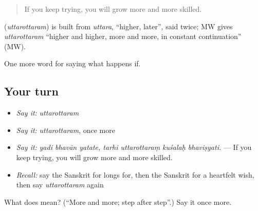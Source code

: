 \begin{quote}
If you keep trying, you will grow more and more skilled.
\end{quote}

\begin{cousinweb}
\textbf{} (\emph{uttarottaram}) is built from \emph{uttara}, \textquotedblleft{}higher, later\textquotedblright{}, said twice; MW gives \emph{uttarottaram} \textquotedblleft{}higher and higher, more and more, in constant continuation\textquotedblright{} (MW).
\end{cousinweb}

\begin{grammarlens}[title={What you've built}]
One more word for saying what happens if.
\end{grammarlens}

\subsection*{Your turn}
\begin{itemize}
\raggedright
  \item \emph{Say it:} \emph{uttarottaram}
  \item \emph{Say it:} \emph{uttarottaram}, once more
  \item \emph{Say it:} \emph{yadi bhavān yatate, tarhi uttarottaraṃ kuśalaḥ bhaviṣyati.} — If you keep trying, you will grow more and more skilled.
  \item \emph{Recall:} say the Sanskrit for longs for, then the Sanskrit for a heartfelt wish, then say \emph{uttarottaram} again
\end{itemize}

\begin{tcolorbox}[breakable,colback=teal!4,colframe=teal!35!black,title={Before you move on}]
What does  mean? (\textquotedblleft{}More and more; step after step\textquotedblright{}.) Say it once more.
\end{tcolorbox}

